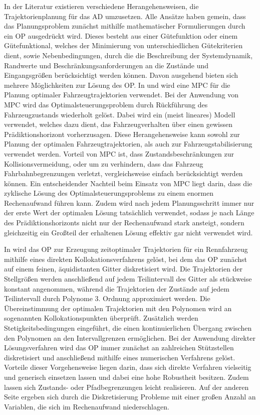 In der Literatur existieren verschiedene Herangehensweisen, die Trajektorienplanung für das \gls{AD} umzusetzen. Alle Ansätze haben gemein, dass das Planungsproblem zunächst mithilfe mathematischer Formulierungen durch ein \gls{OP} ausgedrückt wird. Dieses besteht aus einer Gütefunktion oder einem Gütefunktional, welches der Minimierung von unterschiedlichen Gütekriterien dient, sowie Nebenbedingungen, durch die die Beschreibung der Systemdynamik, Randwerte und Beschränkungsanforderungen an die Zustände und Eingangsgrößen berücksichtigt werden können. Davon ausgehend bieten sich mehrere Möglichkeiten zur Lösung des \gls{OP}. In \cite{shi} und \cite{guo} wird eine \gls{MPC} für die Planung optimaler Fahrzeugtrajektorien verwendet. Bei der Anwendung von \gls{MPC} wird das Optimalsteuerungsproblem durch Rückführung des Fahrzeugzustands wiederholt gelöst. Dabei wird ein (meist lineares) Modell verwendet, welches dazu dient, das Fahrzeugverhalten über einen gewissen Prädiktionshorizont vorherzusagen. Diese Herangehensweise kann sowohl zur Planung der optimalen Fahrzeugtrajektorien, als auch zur Fahrzeugstabilisierung verwendet werden. Vorteil von \gls{MPC} ist, dass Zustandsbeschränkungen zur Kollisionsvermeidung, oder um zu verhindern, dass das Fahrzeug Fahrbahnbegrenzungen verletzt, vergleichsweise einfach berücksichtigt werden können. Ein entscheidender Nachteil beim Einsatz von \gls{MPC} liegt darin, dass die zyklische Lösung des Optimalsteuerungsproblems zu einem enormen Rechenaufwand führen kann. Zudem wird nach jedem Planungsschritt immer nur der erste Wert der optimalen Lösung tatsächlich verwendet, sodass je nach Länge des Prädiktionshorizonts nicht nur der Rechenaufwand stark ansteigt, sondern gleichzeitig ein Großteil der erhaltenen Lösung effektiv gar nicht verwendet wird.  

In \cite{Christ.2021} wird das \gls{OP} zur Erzeugung zeitoptimaler Trajektorien für ein Rennfahrzeug mithilfe eines direkten Kollokationsverfahrens gelöst, bei dem das \gls{OP} zunächst auf einem feinen, äquidistanten Gitter diskretisiert wird. Die Trajektorien der Stellgrößen werden anschließend auf jedem Teilintervall des Gitter als stückweise konstant angenommen, während die Trajektorien der Zustände auf jedem Teilintervall durch Polynome 3. Ordnung approximiert werden. Die Übereinstimmung der optimalen Trajektorien mit den Polynomen wird an sogenannten Kollokationspunkten überprüft. Zusätzlich werden Stetigkeitsbedingungen eingeführt, die einen kontinuierlichen Übergang zwischen den Polynomen an den Intervallgrenzen ermöglichen. Bei der Anwendung direkter Lösungsverfahren wird das \gls{OP} immer zunächst an zahlreichen Stützstellen diskretisiert und anschließend mithilfe eines numerischen Verfahrens gelöst. Vorteile dieser Vorgehensweise liegen darin, dass sich direkte Verfahren vielseitig und generisch einsetzen lassen und dabei eine hohe Robustheit besitzen. Zudem lassen sich Zustands- oder Pfadbegrenzungen leicht realisieren. Auf der anderen Seite ergeben sich durch die Diskretisierung Probleme mit einer großen Anzahl an Variablen, die sich im Rechenaufwand niederschlagen. 

